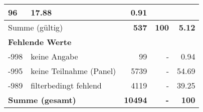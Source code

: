 \begin{longtable}{lXrrr}
       \num{96} &
       \num[round-mode=places,round-precision=2]{17,88} &
         \num[round-mode=places,round-precision=2]{0,91} \\
     \midrule
     \multicolumn{2}{l}{Summe (gültig)} &
       \textbf{\num{537}} &
     \textbf{100} &
       \textbf{\num[round-mode=places,round-precision=2]{5,12}} \\
     \multicolumn{5}{l}{\textbf{Fehlende Werte}}\\
       -998 &
       keine Angabe &
         \num{99} &
        - &
         \num[round-mode=places,round-precision=2]{0,94} \\
       -995 &
       keine Teilnahme (Panel) &
         \num{5739} &
        - &
         \num[round-mode=places,round-precision=2]{54,69} \\
       -989 &
       filterbedingt fehlend &
         \num{4119} &
        - &
         \num[round-mode=places,round-precision=2]{39,25} \\
     \midrule
     \multicolumn{2}{l}{\textbf{Summe (gesamt)}} &
          \textbf{\num{10494}} &
        \textbf{-} &
        \textbf{100} \\
     \bottomrule
     \end{longtable}
     
